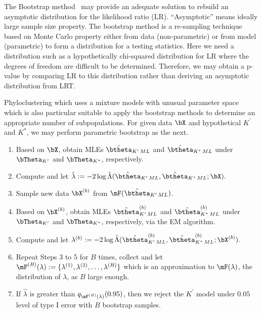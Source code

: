 The Bootstrap method~\citep{Efron1979}
may provide an adequate solution to
rebuild an asymptotic distribution for the likelihood ratio (LR).
``Asymptotic'' means ideally large sample size property.
The bootstrap method is a re-sampling technique
based on Monte Carlo property
either from data (non-parametric)
or from model (parametric) to form a distribution for a testing statistics.
Here we need a distribution such as a
hypothetically chi-squared distribution for LR where the degrees of freedom
are difficult to be determined.
Therefore, we may obtain a p-value by comparing LR to this distribution
rather than deriving an asymptotic distribution from LRT.

Phyloclustering which uses a mixture models with unusual parameter space
which is also particular suitable to apply the bootstrap methods to determine
an appropriate number of subpopulations.
For given data $\bX$ and hypothetical $K^\prime$ and $K^*$,
we may perform parametric bootstrap as the next.
\begin{enumerate}[label=Step \arabic*:]
\item
Based on $\bX$,
obtain MLEs $\hat{\btheta}_{K^\prime\,ML}$ and $\hat{\btheta}_{K^*\,ML}$
under $\bTheta_{K^\prime}$ and $\bTheta_{K^*}$, respectively.

\item
Compute and let
$
  \hat{\lambda} :=
  -2\log \hat{\Lambda}
  (\hat{\btheta}_{K^\prime\,ML},
   \hat{\btheta}_{K^*\,ML}; \bX).
$

\item
Sample new data $\bX^{(b)}$ from $\mF(\hat{\btheta}_{K^\prime\,ML})$.

\item
Based on $\bX^{(b)}$,
obtain MLEs $\hat{\btheta}^{(b)}_{K^\prime\,ML}$ and
$\hat{\btheta}^{(b)}_{K^*\,ML}$
under $\bTheta_{K^\prime}$ and $\bTheta_{K^*}$, respectively,
via the EM algorithm.

\item
Compute and let
$
  \lambda^{(b)} :=
  -2\log \hat{\Lambda}
  (\hat{\btheta}^{(b)}_{K^\prime\,ML},
   \hat{\btheta}^{(b)}_{K^*\,ML}; \bX^{(b)}).
$

\item
Repeat Steps 3 to 5 for $B$ times, collect and let
$\mF^{(B)}(\lambda) := \{\lambda^{(1)}, \lambda^{(2)}, \ldots, \lambda^{(B)}\}$
which is an approximation to $\mF(\lambda)$,
the distribution of $\lambda$, as $B$ large enough.

\item
If $\hat{\lambda}$ is greater than $q_{\mF^{(B)}(\lambda)}(0.95)$, then
we reject the $K^\prime$ model under $0.05$ level of type I error
with $B$ bootstrap samples.

\end{enumerate}
